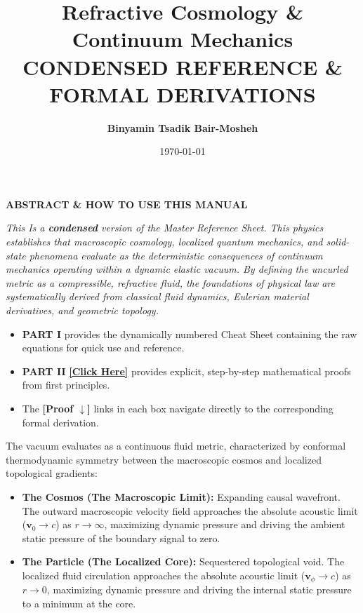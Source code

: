 \documentclass[11pt, a4paper]{article}
\title{\textbf{Refractive Cosmology \& Continuum Mechanics \\ CONDENSED REFERENCE \& FORMAL DERIVATIONS}}
\author{\textbf{Binyamin Tsadik Bair-Mosheh} }
\date{\today}
\begin{document}
\maketitle


\begin{tcolorbox}[colback=gray!5!white, colframe=gray!50!black, arc=1mm, boxrule=0.5pt, left=3mm, right=3mm]
\begin{center}
    \textbf{ABSTRACT \& HOW TO USE THIS MANUAL}
\end{center}
\textit{This Is a \textbf{condensed} version of the Master Reference Sheet.
This physics establishes that macroscopic cosmology, localized quantum mechanics, and solid-state phenomena evaluate  as the deterministic consequences of continuum mechanics operating within a dynamic elastic vacuum. By defining the uncurled metric as a compressible, refractive fluid, the foundations of physical law are systematically derived from classical fluid dynamics, Eulerian material derivatives, and geometric topology.}
\vspace{0.2cm}
\begin{itemize}[nosep]
    \item \textbf{PART I} provides the dynamically numbered Cheat Sheet containing the raw equations for quick use and reference.
    \item \textbf{PART II} \hyperref[sec:part2]{\textbf{[Click Here]}} provides explicit, step-by-step mathematical proofs from first principles. 
    \item The \textbf{[Proof $\downarrow$]} links in each box navigate directly to the corresponding formal derivation.
\end{itemize}
\end{tcolorbox}

\vspace{0.3cm}

\begin{tcolorbox}[cheatbox, title={The Conformal Duality of the Metric \scriptsize\hfill\hyperref[sec:part2]{[See Derivations $\downarrow$]}}]
The vacuum evaluates as a continuous fluid metric, characterized by conformal thermodynamic symmetry between the macroscopic cosmos and localized topological gradients:
\begin{itemize}[leftmargin=*, nosep]
    \item \textbf{The Cosmos (The Macroscopic Limit):} Expanding causal wavefront. The outward macroscopic velocity field approaches the absolute acoustic limit ($\mathbf{v}_0 \to c$) as $r \to \infty$, maximizing dynamic pressure and driving the ambient static pressure of the boundary signal to zero.
    \item \textbf{The Particle (The Localized Core):} Sequestered topological void. The localized fluid circulation approaches the absolute acoustic limit ($\mathbf{v}_{\phi} \to c$) as $r \to 0$, maximizing dynamic pressure and driving the internal static pressure to a minimum at the core.
\end{itemize}
\end{tcolorbox}
\end{document}
